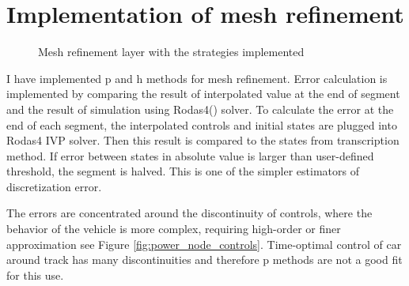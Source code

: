 \section{Implementation of mesh refinement}
\begin{figure}[H]
\centering
{}
\caption{Mesh refinement layer with the strategies implemented}
\label{fig:mesh_refinement_chosen}
\end{figure}

I have implemented p and h methods for mesh refinement. Error calculation is implemented by comparing the result of interpolated value at the end of segment and the result of simulation using Rodas4() solver. To calculate the error at the end of each segment, the interpolated controls and initial states are plugged into Rodas4 IVP solver. Then this result is compared to the states from transcription method. If error between states in absolute value is larger than user-defined threshold, the segment is halved. This is one of the simpler estimators of discretization error.


The errors are concentrated around the discontinuity of controls, where the
behavior of the vehicle is more complex, requiring high-order or finer
approximation see Figure \ref{fig:power_node_controls}. Time-optimal control of car around track has many discontinuities and therefore p methods are not a good fit for this use.

